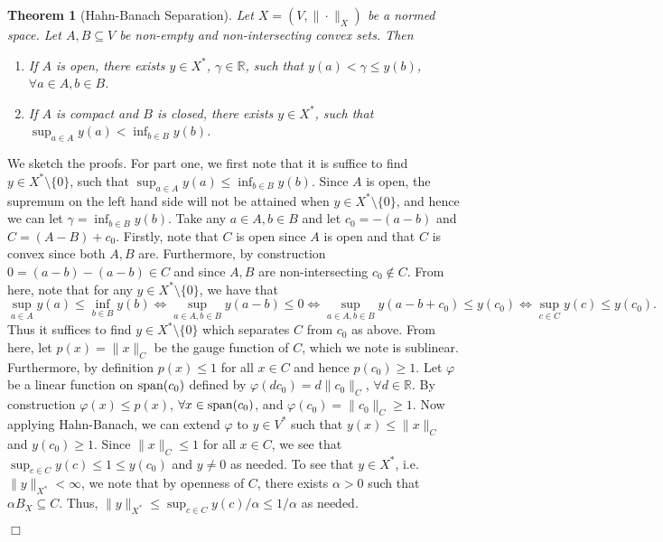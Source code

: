 \documentclass[11pt]{article}
\newtheorem{theorem}{Theorem}
\theoremstyle{plain}
\newenvironment{proof}{\noindent {\sc Proof:}}{$\Box$ \medskip}
\theoremstyle{plain}
\newcommand{\set}[1]{\{{#1}\}}
\newcommand{\R}{\ensuremath{\mathbb{R}}}
\begin{document}
\begin{theorem}[Hahn-Banach Separation] Let $X=(V,\|\cdot\|_X)$ be a normed
space. Let $A,B \subseteq V$ be non-empty and non-intersecting convex sets. Then
\begin{enumerate}
\item If $A$ is open, there exists $y \in X^*$, $\gamma \in \R$, such that $y(a)
< \gamma \leq y(b)$, $\forall a \in A, b \in B$.
\item If $A$ is compact and $B$ is closed, there exists $y \in X^*$, such that
$\sup_{a \in A} y(a) < \inf_{b \in B} y(b)$.
\end{enumerate}
\end{theorem}
\begin{proof}
We sketch the proofs. For part one, we first note that it is suffice to find $y
\in X^* \setminus \set{0}$, such that $\sup_{a \in A} y(a) \leq \inf_{b \in B}
y(b)$. Since $A$ is open, the supremum on the left hand side will not be
attained when $y \in X^* \setminus \set{0}$, and hence we can let $\gamma =
\inf_{b \in B} y(b)$. Take any $a \in A, b \in B$ and let $c_0 = -(a-b)$ and $C
= (A-B)+c_0$. Firstly, note that $C$ is open since $A$ is open and that $C$ is
convex since both $A,B$ are.  Furthermore, by construction $0 = (a-b)-(a-b) \in
C$ and since $A,B$ are non-intersecting $c_0 \notin C$. From here, note that for
any $y \in X^* \setminus \set{0}$, we have that 
\begin{equation}
\label{eq:sep-hb}
\sup_{a \in A} y(a) \leq \inf_{b \in B} y(b) \Leftrightarrow \sup_{a \in
A, b \in B} y(a-b) \leq 0 \Leftrightarrow \sup_{a \in A, b \in B} y(a-b+c_0)
\leq y(c_0) \Leftrightarrow \sup_{c \in C} y(c) \leq y(c_0). 
\end{equation}
Thus it suffices to find $y \in X^* \setminus \set{0}$ which separates $C$ from
$c_0$ as above. From here, let $p(x) = \|x\|_C$ be the gauge function of $C$,
which we note is sublinear. Furthermore, by definition $p(x) \leq 1$ for all $x
\in C$ and hence $p(c_0) \geq 1$. Let $\varphi$ be a linear function on ${\rm
span}(c_0)$ defined by $\varphi(d c_0) = d\|c_0\|_C$, $\forall d \in \R$. By
construction $\varphi(x) \leq p(x)$, $\forall x \in {\rm span}(c_0)$, and
$\varphi(c_0) = \|c_0\|_C \geq 1$.  Now applying Hahn-Banach, we can extend
$\varphi$ to $y \in V^*$ such that $y(x) \leq \|x\|_C$ and $y(c_0) \geq 1$.
Since $\|x\|_C \leq 1$ for all $x \in C$, we see that $\sup_{c \in C} y(c) \leq
1 \leq y(c_0)$ and $y \neq 0$ as needed. To see that $y \in X^*$,
i.e.~$\|y\|_{X^*} < \infty$, we note that by openness of $C$, there exists
$\alpha > 0$ such that $\alpha B_X \subseteq C$. Thus, $\|y\|_{X^*} \leq \sup_{c
\in C} y(c)/\alpha \leq 1/\alpha$ as needed. 


\end{proof}
\end{document}
